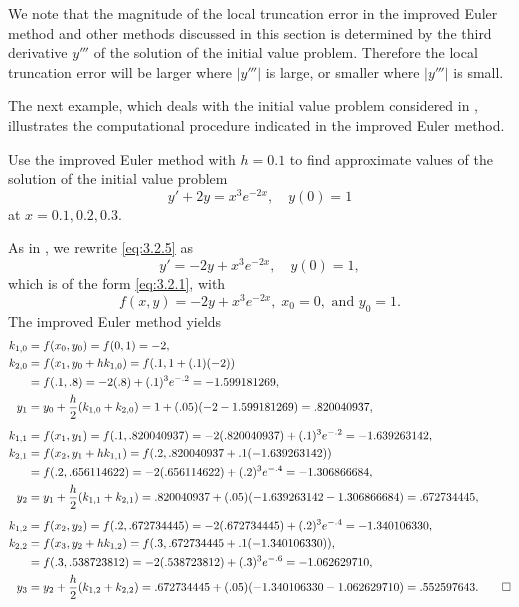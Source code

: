 We note that the magnitude of the local truncation error in the
improved Euler method and other methods discussed in this section is
determined by the third derivative $y'''$ of the solution of the
initial value problem. Therefore the local truncation error will be
larger where $|y'''|$ is large, or smaller where $|y'''|$ is small.

The next example, which deals with the initial value problem
considered in , illustrates
the computational procedure indicated in the improved Euler method.

\begin{example}\label{example:3.2.1}
Use the improved Euler method with $h=0.1$ to find approximate values
of the solution of the initial value problem
\begin{equation}\label{eq:3.2.5}
y'+2y=x^3e^{-2x},\quad y(0)=1
\end{equation}
at $x=0.1,0.2,0.3$.
\end{example}

\begin{solution}
As in , we rewrite \eqref{eq:3.2.5} as
\[
y'=-2y+x^3e^{-2x},\quad y(0)=1,
\]
which is of the form \eqref{eq:3.2.1}, with
\[
f(x,y)=-2y+x^3e^{-2x},\; x_0=0,\text{ and } y_0=1.
\]
The improved Euler method yields
{\allowdisplaybreaks
\begin{align*}
k_{1,0} & = f(x_0,y_0) = f(0,1)=-2,\\
k_{2,0} & = f(x_1,y_0+hk_{1,0})=f(.1,1+(.1)(-2))\\
 &= f(.1,.8)=-2(.8)+(.1)^3e^{-.2}=-1.599181269,\\
y_1&=y_0+\frac{h}{2}(k_{1,0}+k_{2,0})=1+(.05)(-2-1.599181269)=.820040937,\\\addlinespace
k_{1,1} & = f(x_1,y_1)
  = f(.1,.820040937)= -2(.820040937)+(.1)^3e^{-.2}=-1.639263142,\\
k_{2,1} & = f(x_2,y_1+hk_{1,1})=f(.2,.820040937+.1(-1.639263142))\\
 &=f(.2,.656114622)=-2(.656114622)+(.2)^3e^{-.4}=-1.306866684,\\
y_2&=y_1+\frac{h}{2}(k_{1,1}+k_{2,1})
=.820040937+(.05)(-1.639263142-1.306866684)=.672734445,\\\addlinespace
k_{1,2} & = f(x_2,y_2)
  = f(.2,.672734445)= -2(.672734445)+(.2)^3e^{-.4}=-1.340106330,\\
k_{2,2} & = f(x_3,y_2+hk_{1,2})=f(.3,.672734445+.1(-1.340106330)),\\
 &=f(.3,.538723812)=-2(.538723812)+(.3)^3e^{-.6}=-1.062629710,\\
y_3&=y_2+\frac{h}{2}(k_{1,2}+k_{2,2})
=.672734445+(.05)(-1.340106330-1.062629710)=.552597643.\qedhere
\end{align*}}
\end{solution}

